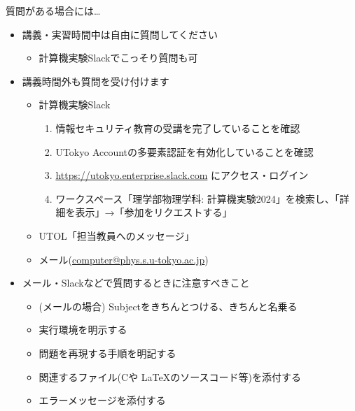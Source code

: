 \begin{frame}[t]{質問がある場合には…}
  \begin{itemize}
  \item 講義・実習時間中は自由に質問してください
    \begin{itemize}
    \item 計算機実験Slackでこっそり質問も可
    \end{itemize}
  \item 講義時間外も質問を受け付けます
    \begin{itemize}
    \item 計算機実験Slack
      \begin{enumerate}
        \item 情報セキュリティ教育の受講を完了していることを確認
        \item UTokyo Accountの多要素認証を有効化していることを確認
        \item \href{https://utokyo.enterprise.slack.com/}{https://utokyo.enterprise.slack.com} にアクセス・ログイン
        \item ワークスペース「理学部物理学科: 計算機実験2024」を検索し、「詳細を表示」→「参加をリクエストする」
      \end{enumerate}
    \item UTOL「担当教員へのメッセージ」
    \item メール(\href{mailto:computer@phys.s.u-tokyo.ac.jp}{computer@phys.s.u-tokyo.ac.jp})
    \end{itemize}
  \item メール・Slackなどで質問するときに注意すべきこと
    \begin{itemize}
    \item (メールの場合) Subjectをきちんとつける、きちんと名乗る
    \item 実行環境を明示する
    \item 問題を再現する手順を明記する
    \item 関連するファイル(Cや \LaTeX のソースコード等)を添付する
    \item エラーメッセージを添付する
    \end{itemize}
  \end{itemize}
\end{frame}
